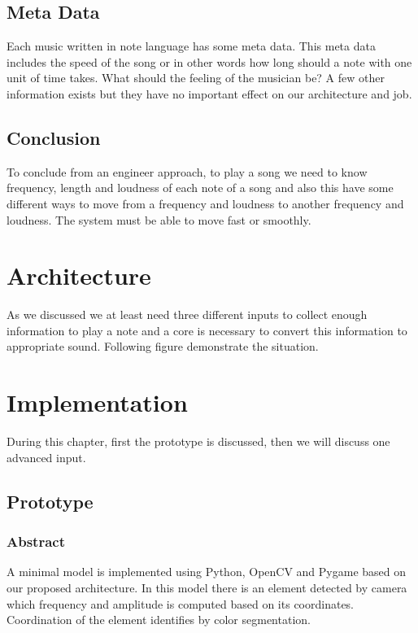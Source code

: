 \section{Meta Data}
Each music written in note language has some meta data. This meta data includes the speed of the song or in other words how long should a note with one unit of time takes. What should the feeling of the musician be? A few other information exists but they have no important effect on our architecture and job. 


\section{Conclusion}
To conclude from an engineer approach, to play a song we need to know frequency, length and loudness of each note of a song and also this have some different ways to move from a frequency and loudness to another frequency and loudness. The system must be able to move fast or smoothly. 


\chapter{Architecture}
As we discussed we at least need three different inputs to collect enough information to play a note and a core is necessary to convert this information to appropriate sound. Following figure demonstrate the situation.


\pagebreak
\chapter{Implementation}
During this chapter, first the prototype is discussed, then we will discuss one advanced input. 

\section{Prototype}

\subsection{Abstract}{A minimal model is implemented using Python, OpenCV and Pygame based on our proposed architecture. In this model there is an element detected by camera which frequency and amplitude is computed based on its coordinates. Coordination of the element identifies by color segmentation.}

